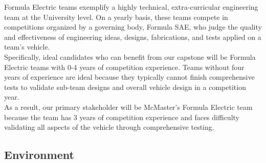 \documentclass{article}
\begin{document}
Formula Electric teams exemplify a highly technical, extra-curricular engineering team at the University level. On a yearly basis, these teams compete in competitions organized by a governing body, Formula SAE, who judge the quality and effectiveness of engineering ideas, designs, fabrications, and tests applied on a team's vehicle. \\

Specifically, ideal candidates who can benefit from our capstone will be Formula Electric teams with 0-4 years of competition experience. Teams without four years of experience are ideal because they typically cannot finish comprehensive tests to  validate sub-team designs and overall vehicle design in a competition year. \\

As a result, our primary stakeholder will be McMaster's Formula Electric team because the team has 3 years of competition experience and faces difficulty validating all aspects of the vehicle through comprehensive testing.




\subsection{Environment}

\end{document}
